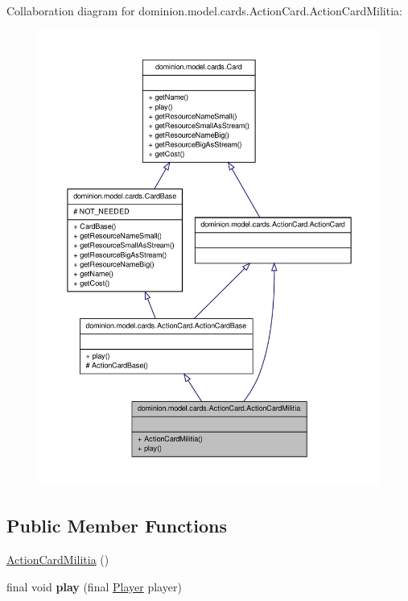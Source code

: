 \-Collaboration diagram for dominion.\-model.\-cards.\-Action\-Card.\-Action\-Card\-Militia\-:
\nopagebreak
\begin{figure}[H]
\begin{center}
\leavevmode
\includegraphics[width=350pt]{classdominion_1_1model_1_1cards_1_1ActionCard_1_1ActionCardMilitia__coll__graph}
\end{center}
\end{figure}
\subsection*{\-Public \-Member \-Functions}
\begin{DoxyCompactItemize}
\item 
\hyperlink{classdominion_1_1model_1_1cards_1_1ActionCard_1_1ActionCardMilitia_a379a209b37d56e9a566b0be58839ea25}{\-Action\-Card\-Militia} ()
\item 
\hypertarget{classdominion_1_1model_1_1cards_1_1ActionCard_1_1ActionCardMilitia_a0c717dcd95d55ae704fb9847415893d9}{final void {\bfseries play} (final \hyperlink{interfacedominion_1_1model_1_1Player}{\-Player} player)}\label{classdominion_1_1model_1_1cards_1_1ActionCard_1_1ActionCardMilitia_a0c717dcd95d55ae704fb9847415893d9}

\end{DoxyCompactItemize}


